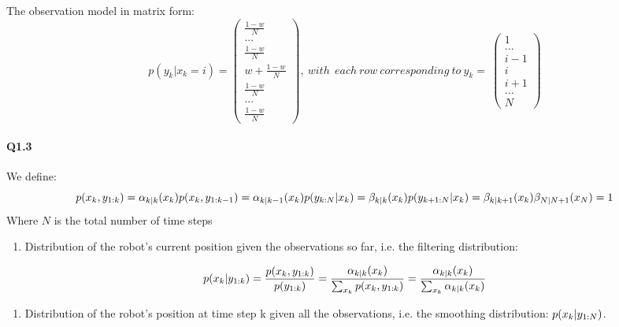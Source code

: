 \documentclass[11pt]{article}
\providecommand{\tightlist}{%
      \setlength{\itemsep}{0pt}\setlength{\parskip}{0pt}}
\begin{document}
    The observation model in matrix form: \[p(y_{k}|x_k=i)= \begin{pmatrix}
 \frac{1-w}{N}    \\
...  \\
 \frac{1-w}{N}  \\
w +  \frac{1-w}{N}  \\
 \frac{1-w}{N}  \\
...  \\
 \frac{1-w}{N} 
\end{pmatrix}, \ with\ \  each\  row \  corresponding\ to \ y_{k} = \  
\begin{pmatrix}
 1   \\
...  \\
i-1 \\
i  \\
i+1 \\
...  \\
N 
\end{pmatrix}  \]

    \paragraph{Q1.3}\label{q1.3}

We define: \[
\large p(x_k, y_{1:k}) =  \alpha_{k|k}(x_k) \\
\large p(x_k, y_{1:k-1}) = \alpha_{k|k-1}(x_k) \\
\large p(y_{k:N}|x_k) = \beta_{k|k}(x_k) \\
\large p(y_{k+1:N}|x_k) = \beta_{k|k+1}(x_k) \\
\large \beta_{N|N+1}(x_N) = 1
\] Where \(N\) is the total number of time steps

    \begin{enumerate}
\def\labelenumi{(\alph{enumi})}
\tightlist
\item
  Distribution of the robot's current position given the observations so
  far, i.e. the filtering distribution:
\end{enumerate}

\[\large p(x_k | y_{1:k}) = \frac{p(x_k,  y_{1:k})}{p(y_{1:k})} = \frac{\alpha_{k|k}(x_k)}{\sum_{x_k}p(x_k, y_{1:k})} = \frac{\alpha_{k|k}(x_k)}{\sum_{x_k}\alpha_{k|k}(x_k)}\]

    \begin{enumerate}
\def\labelenumi{(\alph{enumi})}
\setcounter{enumi}{1}
\tightlist
\item
  Distribution of the robot's position at time step k given all the
  observations, i.e. the smoothing distribution:
  \(\large p(x_k | y_{1:N})\).
\end{enumerate}
\end{document}
